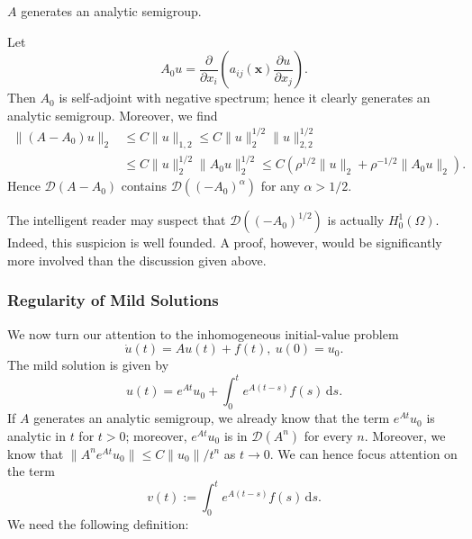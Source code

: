 \begin{Theorem}
\label{thm:elliptic-dirichlet-analytic-generation}
$A$ generates an analytic semigroup.
\end{Theorem}

\begin{Proof}
Let
\begin{equation}\label{eq:analytic-semigroup-elliptic-principal-self-adjoint-part}
A_0u=\dfrac{\partial}{\partial x_i}\left(a_{ij}(\bm{x})\dfrac{\partial u}{\partial x_j}\right).
\end{equation}
Then $A_0$ is self-adjoint with negative spectrum; hence it clearly generates an analytic semigroup. Moreover, we find\[\begin{aligned}
\|(A-A_0)u\|_2&\leq C\|u\|_{1,2}\leq C\|u\|_2^{1/2}\|u\|_{2,2}^{1/2}\\
&\leq C\|u\|_2^{1/2}\|A_0u\|_2^{1/2}\leq C(\rho^{1/2}\|u\|_2+\rho^{-1/2}\|A_0u\|_2).
\end{aligned}\]Hence $\mathcal{D}(A-A_0)$ contains $\mathcal{D}((-A_0)^\alpha)$ for any $\alpha>1/2$.
\end{Proof}

\begin{Remark}
\label{rem:elliptic-square-root-dirichlet-domain}
The intelligent reader may suspect that $\mathcal{D}((-A_0)^{1/2})$ is actually $H_0^1(\Omega)$. Indeed, this suspicion is well founded. A proof, however, would be significantly more involved than the discussion given above.
\end{Remark}

\subsubsection{Regularity of Mild Solutions}\label{subsec:analytic-mild-solution-regularity}

We now turn our attention to the inhomogeneous initial-value problem
\begin{equation}\label{eq:analytic-semigroup-inhomogeneous-mild-initial-value-problem}
\dot u(t)=Au(t)+f(t),\ u(0)=u_0.
\end{equation}
The mild solution is given by
\begin{equation}\label{eq:analytic-semigroup-mild-solution-representation}
u(t)=e^{At}u_0+\int_0^t e^{A(t-s)}f(s)\,\mathrm{d}s.
\end{equation}
If $A$ generates an analytic semigroup, we already know that the term $e^{At}u_0$ is analytic in $t$ for $t>0$; moreover, $e^{At}u_0$ is in $\mathcal{D}(A^n)$ for every $n$. Moreover, we know that $\|A^ne^{At}u_0\|\leq C\|u_0\|/t^n$ as $t\to0$. We can hence focus attention on the term
\begin{equation}\label{eq:analytic-semigroup-mild-inhomogeneous-convolution}
v(t):=\int_0^t e^{A(t-s)}f(s)\,\mathrm{d}s.
\end{equation}
We need the following definition:

